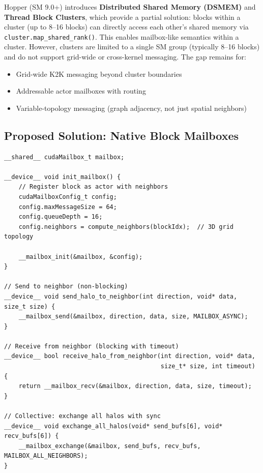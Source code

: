 \documentclass[11pt,a4paper]{article}
\begin{document}
Hopper (SM 9.0+) introduces \textbf{Distributed Shared Memory (DSMEM)} and \textbf{Thread Block Clusters}, which provide a partial solution: blocks within a cluster (up to 8--16 blocks) can directly access each other's shared memory via \texttt{cluster.map\_shared\_rank()}. This enables mailbox-like semantics within a cluster. However, clusters are limited to a single SM group (typically 8--16 blocks) and do not support grid-wide or cross-kernel messaging. The gap remains for:
\begin{itemize}[leftmargin=*,topsep=2pt,itemsep=1pt]
    \item Grid-wide K2K messaging beyond cluster boundaries
    \item Addressable actor mailboxes with routing
    \item Variable-topology messaging (graph adjacency, not just spatial neighbors)
\end{itemize}

\subsection{Proposed Solution: Native Block Mailboxes}

\begin{lstlisting}[style=cstyle,title={Kernel setup - declare mailbox topology}]
__shared__ cudaMailbox_t mailbox;

__device__ void init_mailbox() {
    // Register block as actor with neighbors
    cudaMailboxConfig_t config;
    config.maxMessageSize = 64;
    config.queueDepth = 16;
    config.neighbors = compute_neighbors(blockIdx);  // 3D grid topology

    __mailbox_init(&mailbox, &config);
}

// Send to neighbor (non-blocking)
__device__ void send_halo_to_neighbor(int direction, void* data, size_t size) {
    __mailbox_send(&mailbox, direction, data, size, MAILBOX_ASYNC);
}

// Receive from neighbor (blocking with timeout)
__device__ bool receive_halo_from_neighbor(int direction, void* data,
                                           size_t* size, int timeout) {
    return __mailbox_recv(&mailbox, direction, data, size, timeout);
}

// Collective: exchange all halos with sync
__device__ void exchange_all_halos(void* send_bufs[6], void* recv_bufs[6]) {
    __mailbox_exchange(&mailbox, send_bufs, recv_bufs, MAILBOX_ALL_NEIGHBORS);
}
\end{lstlisting}
\end{document}

